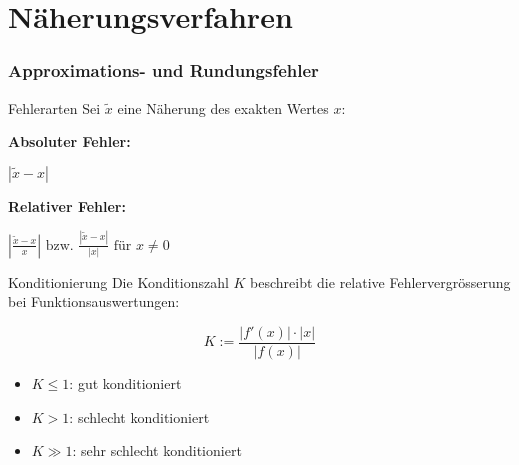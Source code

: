 \section{Näherungsverfahren}

\subsubsection{Approximations- und Rundungsfehler}

\begin{definition}{Fehlerarten}
Sei $\tilde{x}$ eine Näherung des exakten Wertes $x$:
\vspace{1mm}\\
\begin{minipage}[t]{0.45\textwidth}
    \textbf{Absoluter Fehler:} 
    \begin{center} $\left|\tilde{x}-x\right|$ \end{center}
\end{minipage}
\hspace{3mm}
\begin{minipage}[t]{0.5\textwidth}
    \textbf{Relativer Fehler:} 
    \begin{center} $\left|\frac{\tilde{x}-x}{x}\right| \text{ bzw. } \frac{|\tilde{x}-x|}{|x|} \text{ für } x \neq 0$ \end{center}
\end{minipage}
\end{definition}

\begin{concept}{Konditionierung}
    Die Konditionszahl $K$ beschreibt die relative Fehlervergrösserung bei Funktionsauswertungen:
    \vspace{1mm}\\
\begin{minipage}{0.3\textwidth}
    \vspace{-2mm}
    $$K := \frac{|f'(x)| \cdot |x|}{|f(x)|}$$
\end{minipage}
\hspace{2mm}
\begin{minipage}{0.6\textwidth}
\begin{itemize}
    \item $K \leq 1$: gut konditioniert
    \item $K > 1$: schlecht konditioniert
    \item $K \gg 1$: sehr schlecht konditioniert
\end{itemize}
\end{minipage}
\end{concept}


